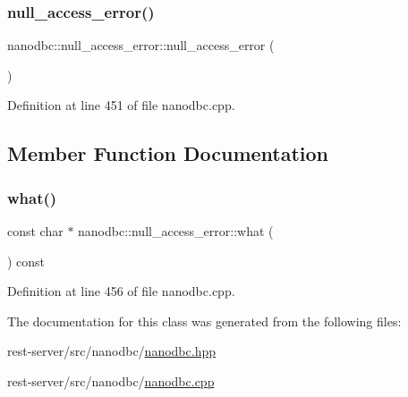 \subsubsection{\texorpdfstring{null\_access\_error()}{null\_access\_error()}}
{\footnotesize\ttfamily nanodbc\+::null\+\_\+access\+\_\+error\+::null\+\_\+access\+\_\+error (\begin{DoxyParamCaption}{ }\end{DoxyParamCaption})}



Definition at line 451 of file nanodbc.\+cpp.



\subsection{Member Function Documentation}
\mbox{\label{classnanodbc_1_1null__access__error_a59f79b8c5a6aec646e7b4e75b6c94624}} 
\subsubsection{\texorpdfstring{what()}{what()}}
{\footnotesize\ttfamily const char $\ast$ nanodbc\+::null\+\_\+access\+\_\+error\+::what (\begin{DoxyParamCaption}{ }\end{DoxyParamCaption}) const\hspace{0.3cm}{\ttfamily [noexcept]}}



Definition at line 456 of file nanodbc.\+cpp.



The documentation for this class was generated from the following files\+:\begin{DoxyCompactItemize}
\item 
rest-\/server/src/nanodbc/\mbox{\hyperlink{nanodbc_8hpp}{nanodbc.\+hpp}}\item 
rest-\/server/src/nanodbc/\mbox{\hyperlink{nanodbc_8cpp}{nanodbc.\+cpp}}\end{DoxyCompactItemize}
